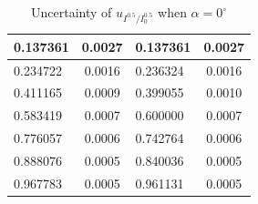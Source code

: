 \documentclass[12pt, a4paper]{article}
\begin{document}
\begin{table}[H]
\begin{tabular}{|l|cl|l|cl|}
	0.137361        & \multicolumn{2}{c|}{0.0027}                                & 0.137361        & \multicolumn{2}{c|}{0.0027}                                \\ \hline
	0.234722        & \multicolumn{2}{c|}{0.0016}                                & 0.236324        & \multicolumn{2}{c|}{0.0016}                                \\ \hline
	0.411165        & \multicolumn{2}{c|}{0.0009}                                & 0.399055        & \multicolumn{2}{c|}{0.0010}                                \\ \hline
	0.583419        & \multicolumn{2}{c|}{0.0007}                                & 0.600000        & \multicolumn{2}{c|}{0.0007}                                \\ \hline
	0.776057        & \multicolumn{2}{c|}{0.0006}                                & 0.742764        & \multicolumn{2}{c|}{0.0006}                                \\ \hline
	0.888076        & \multicolumn{2}{c|}{0.0005}                                & 0.840036        & \multicolumn{2}{c|}{0.0005}                                \\ \hline
	0.967783        & \multicolumn{2}{c|}{0.0005}                                & 0.961131        & \multicolumn{2}{c|}{0.0005}                                \\ \hline
	\end{tabular}
	\caption{Uncertainty of $u_{I^{0.5} / I^{0.5}_{0}}$ when $\alpha = 0^{\circ}$}
	\label{tab-3}
\end{table}
\end{document}
